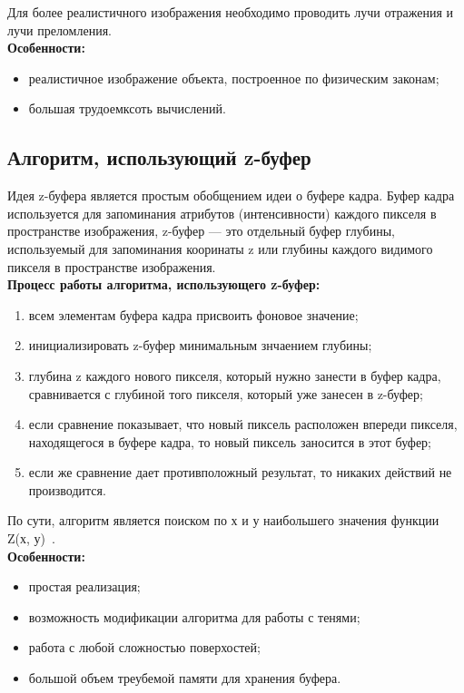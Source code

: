 Для более реалистичного изображения необходимо проводить лучи отражения и лучи преломления.\\

\clearpage
\textbf{Особенности:}
\begin{itemize}
    \item реалистичное изображение объекта, построенное по физическим законам;
    \item большая трудоемксоть вычислений.
\end{itemize}

\subsection{Алгоритм, использующий z-буфер}

Идея z-буфера является простым обобщением идеи о буфере кадра. 
Буфер кадра используется для запоминания атрибутов (интенсивности) каждого пикселя в пространстве изображения, z-буфер ---
это отдельный буфер глубины, используемый для запоминания кооринаты z или
глубины каждого видимого пикселя в пространстве изображения. \\

\textbf{Процесс работы алгоритма, использующего z-буфер:}

\begin{enumerate}
    \item всем элементам буфера кадра присвоить фоновое значение;
    \item инициализировать z-буфер минимальным знчаением глубины;
    \item глубина z каждого нового пикселя, который нужно занести в буфер кадра, сравнивается с глубиной того пикселя,
    который уже занесен в z-буфер;
    \item если сравнение показывает, что новый пиксель расположен впереди пикселя,
    находящегося в буфере кадра, то новый пиксель заносится в этот буфер;
    \item если же сравнение дает противположный результат, то никаких действий не производится.
\end{enumerate}

По сути, алгоритм является поиском по х и у наибольшего значения функции Z(х, у)~\cite{tpu}.\\

\textbf{Особенности:}
\begin{itemize}
    \item простая реализация;
    \item возможность модификации алгоритма для работы с тенями;
    \item работа с любой сложностью поверхостей;
    \item большой объем треубемой памяти для хранения буфера.
\end{itemize}

